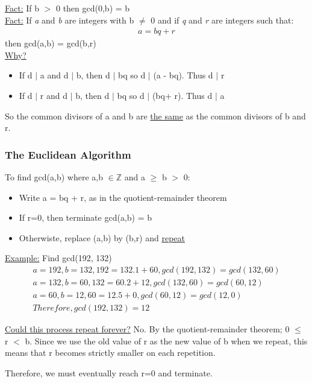 \documentclass{article}
\begin{document}
\underline{Fact:} If b $>$ 0 then gcd(0,b) = b \\

\underline{Fact:} If \textit{a} and \textit{b} are integers with b $\neq$ 0 and if \textit{q} and \textit{r} are integers such that:
\begin{align}
a = bq + r
\end{align}
then gcd(a,b) = gcd(b,r) \\

\underline{Why?}
\begin{itemize}
\item If d $|$ a and d $|$ b, then d $|$ bq so d $|$ (a - bq). Thus d $|$ r
\item If d $|$ r and d $|$ b, then d $|$ bq so d $|$ (bq+ r). Thus d $|$ a
\end{itemize}
So the common divisors of a and b are \underline{the same} as the common divisors of b and r.

\subsubsection{The Euclidean Algorithm}

To find gcd(a,b) where a,b $\in \mathbb{Z}$ and a $\geq$ b $>$ 0:
\begin{itemize}
\item Write a = bq + r, as in the quotient-remainder theorem
\item If r=0, then terminate gcd(a,b) = b
\item Otherwiste, replace (a,b) by (b,r) and \underline{repeat}
\end{itemize}

\underline{Example:} Find gcd(192, 132)
\begin{align}
a = 192, b = 132, 192 = 132.1 + 60, gcd(192,132) = gcd(132,60) \\
a = 132, b = 60, 132 = 60.2 + 12, gcd(132,60) = gcd(60,12) \\
a = 60, b = 12, 60 = 12.5 + 0, gcd(60,12) = gcd(12,0) \\
Therefore, gcd(192,132) = 12
\end{align}

\underline{Could this process repeat forever?}
No. By the quotient-remainder theorem; 0 $\leq$ r $<$ b. Since we use the old value of r as the new value of b when we repeat, this means that r becomes strictly smaller on each repetition.

Therefore, we must eventually reach r=0 and terminate.
\end{document}
